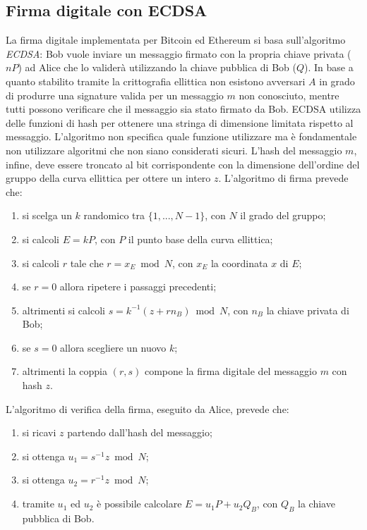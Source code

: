 \subsection{Firma digitale con ECDSA}
La firma digitale implementata per Bitcoin ed Ethereum si basa sull'algoritmo \textit{ECDSA}: Bob vuole inviare un messaggio firmato con la propria chiave privata ($nP$) ad Alice che lo validerà utilizzando la chiave pubblica di Bob ($Q$).\newline
In base a quanto stabilito tramite la crittografia ellittica non esistono avversari $A$ in grado di produrre una signature valida per un messaggio $m$ non conosciuto, mentre tutti possono verificare che il messaggio sia stato firmato da Bob.\newline\newline
ECDSA utilizza delle funzioni di hash per ottenere una stringa di dimensione limitata rispetto al messaggio. L'algoritmo non specifica quale funzione utilizzare ma è fondamentale non utilizzare algoritmi che non siano considerati sicuri.\newline
L'hash del messaggio $m$, infine, deve essere troncato al bit corrispondente con la dimensione dell'ordine del gruppo della curva ellittica per ottere un intero $z$. L'algoritmo di firma prevede che:
\begin{enumerate}
    \item si scelga un $k$ randomico tra $\{1,...,N-1\}$, con $N$ il grado del gruppo;
    \item si calcoli $E=kP$, con $P$ il punto base della curva ellittica;
    \item si calcoli $r$ tale che $r=x_E \bmod N$, con $x_E$ la coordinata $x$ di $E$;
    \item se $r=0$ allora ripetere i passaggi precedenti;
    \item altrimenti si calcoli $s=k^{-1}(z+rn_B)\bmod N$, con $n_B$ la chiave privata di Bob;
    \item se $s=0$ allora scegliere un nuovo $k$;
    \item altrimenti la coppia $(r,s)$ compone la firma digitale del messaggio $m$ con hash $z$.
\end{enumerate}
L'algoritmo di verifica della firma, eseguito da Alice, prevede che:
\begin{enumerate}
    \item si ricavi $z$ partendo dall'hash del messaggio;
    \item si ottenga $u_1=s^{-1}z\bmod N$;
    \item si ottenga $u_2=r^{-1}z\bmod N$;
    \item tramite $u_1$ ed $u_2$ è possibile calcolare $E=u_1P+u_2Q_B$, con $Q_B$ la chiave pubblica di Bob.
\end{enumerate}
